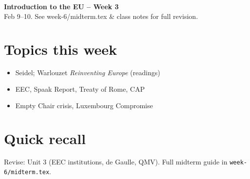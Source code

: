\documentclass[10pt,a4paper]{article}
\begin{document}
\begin{center}
{\large\bfseries\color{eublue} Introduction to the EU -- Week 3}\\[0.2em]
\footnotesize Feb 9--10. See week-6/midterm.tex \& class notes for full revision.
\end{center}\vspace{0.5em}

\section*{\color{eublue}Topics this week}
\begin{itemize}
\item Seidel; Warlouzet \textit{Reinventing Europe} (readings)
\item EEC, Spaak Report, Treaty of Rome, CAP
\item Empty Chair crisis, Luxembourg Compromise
\end{itemize}

\section*{Quick recall}
Revise: Unit 3 (EEC institutions, de Gaulle, QMV). Full midterm guide in \texttt{week-6/midterm.tex}.
\end{document}
